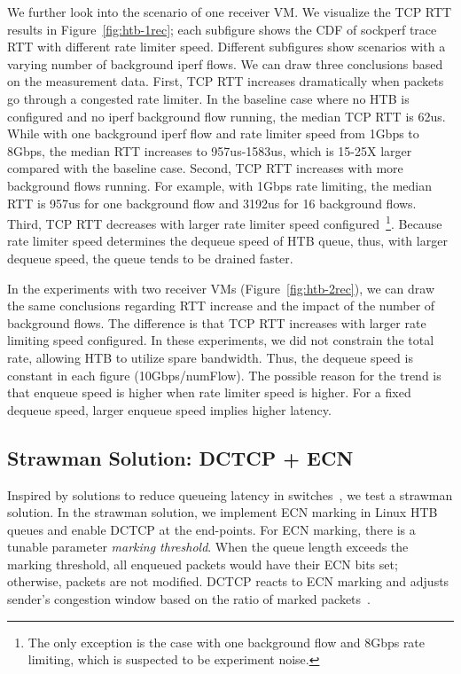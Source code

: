 We further look into the scenario of one receiver VM. 
We visualize the TCP RTT results in Figure~\ref{fig:htb-1rec}; each subfigure shows 
the CDF of sockperf trace RTT with different rate limiter speed. 
Different subfigures show scenarios with a varying number of background iperf flows. 
We can draw three conclusions based on the measurement data. First, TCP RTT increases dramatically when packets go through 
a congested rate limiter. 
In the baseline case where no HTB is configured and no iperf background flow running, the median TCP RTT is 62us. 
While with one background iperf flow and rate limiter speed from 1Gbps to 8Gbps, 
the median RTT increases to 957us-1583us, which is 15-25X larger compared with the baseline case. 
Second, TCP RTT increases with more background flows running. For example, 
with 1Gbps rate limiting, the median RTT is 957us for one background flow and 3192us for 16 background flows. 
Third, TCP RTT decreases with larger rate limiter speed 
configured~\footnote{The only exception is the case with one background flow and 
8Gbps rate limiting, which is suspected to be experiment noise.}. 
Because rate limiter speed determines the dequeue speed of HTB queue, thus, with larger dequeue speed, 
the queue tends to be drained faster. 

In the experiments with two receiver VMs (Figure~\ref{fig:htb-2rec}), we can draw the same conclusions regarding RTT increase 
and the impact of the number of background flows. The difference is that TCP RTT increases with 
larger rate limiting speed configured. In these experiments, we did not constrain the total rate, 
allowing HTB to utilize spare bandwidth. Thus, the dequeue speed is constant in each figure (10Gbps/numFlow). 
The possible reason for the trend is that enqueue speed is higher when rate limiter speed is higher.
For a fixed dequeue speed, larger enqueue speed implies higher latency.

\subsection{Strawman Solution: DCTCP + ECN}

Inspired by solutions to reduce queueing latency in switches~\cite{dctcp}, 
we test a strawman solution. In the strawman solution, 
we implement ECN marking in Linux HTB queues and enable DCTCP at the end-points. 
For ECN marking, there is a tunable parameter \textemdash\xspace \textit{marking threshold}. 
When the queue length exceeds the marking threshold, 
all enqueued packets would have their ECN bits set; otherwise, packets are not modified. 
DCTCP reacts to ECN marking and adjusts sender's congestion window based on the ratio of marked packets~\cite{dctcp}.


